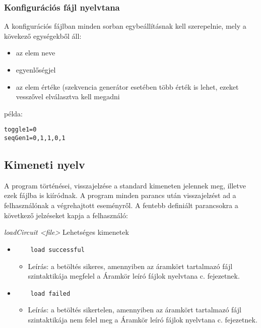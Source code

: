 \subsubsection{Konfigurációs fájl nyelvtana}

A konfigurációs fájlban minden sorban egybeállításnak kell szerepelnie, mely a kövekező egységekből áll:
\begin{itemize}
	\item az elem neve
	\item egyenlőségjel
	\item az elem értéke (szekvencia generátor esetében több érték is lehet, ezeket vesszővel elválasztva kell megadni
\end{itemize}

példa:
\begin{verbatim}
toggle1=0
seqGen1=0,1,1,0,1
\end{verbatim}

\subsection{Kimeneti nyelv}

A program történései, visszajelzése a standard kimeneten jelennek meg, illetve ezek fájlba is kiíródnak. A program minden parancs után visszajelzést ad a felhasználónak a végrehajtott eseményről. A fentebb definiált parancsokra a következő jelzéseket kapja a felhasználó:\newline

\textit{loadCircuit <file>}\newline
Lehetséges kimenetek
\begin{itemize}
	\item
	\begin{verbatim}
	load successful
	\end{verbatim}
	\begin{itemize}
		\item Leírás: a betöltés sikeres, amennyiben az áramkört tartalmazó fájl szintaktikája megfelel a Áramkör leíró fájlok nyelvtana c. fejezetnek.
	\end{itemize}
	\item 
	\begin{verbatim}
	load failed
	\end{verbatim}
	\begin{itemize}
		\item Leírás: a betöltés sikertelen, amennyiben az áramkört tartalmazó fájl szintaktikája nem felel meg a Áramkör leíró fájlok nyelvtana c. fejezetnek.
	\end{itemize}
\end{itemize}

